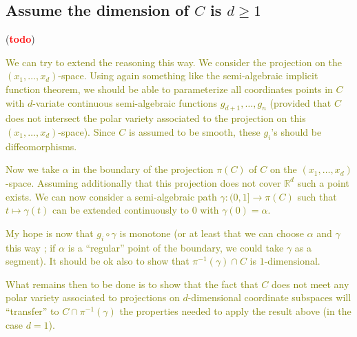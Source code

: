 \documentclass[11pt]{article}
\theoremstyle{definition}
\newcommand{\R}{\mathbb{R}}
\def\td{(\textcolor{red}{{\bf todo}})}
\def\td{(\textcolor{red}{{\bf todo}}) }
\def\ms#1{\textcolor{olive}{#1}}
\begin{document}
\subsection*{Assume the dimension of $C$ is $d\geq 1$}
\td 





\ms{We can try to extend the reasoning this way. We consider the projection on
  the $(x_1, \ldots, x_d)$-space. Using again something like the semi-algebraic
  implicit function theorem, we should be able to parameterize all coordinates
  points in $C$ with $d$-variate continuous semi-algebraic functions $g_{d+1},
  \ldots, g_n$ (provided that $C$ does not intersect the polar variety
  associated to the projection on this $(x_1, \ldots, x_d)$-space). Since $C$ is
  assumed to be smooth, these $g_i$'s should be diffeomorphisms.}

\ms{Now we take $\alpha$ in the boundary of the projection $\pi(C)$ of $C$ on
  the $(x_1, \ldots, x_d)$-space. Assuming additionally that this projection
  does not cover $\R^d$ such a point exists. We can now consider a
  semi-algebraic path $\gamma:(0, 1]\to \pi(C)$ such that $t\mapsto \gamma(t)$
  can be extended continuously to $0$ with $\gamma(0)=\alpha$. }

\ms{My hope is now that $g_i\circ \gamma$ is monotone (or at least that we can
  choose $\alpha$ and $\gamma$ this way ; if $\alpha$ is a ``regular'' point of
  the boundary, we could take $\gamma$ as a segment). It should be ok also to
  show that $\pi^{-1}(\gamma)\cap C$ is $1$-dimensional. }

\ms{What remains then to be done is to show that the fact that $C$ does not meet
any polar variety associated to projections on $d$-dimensional coordinate
subspaces will ``transfer'' to $C\cap \pi^{-1}(\gamma)$ the properties needed to
apply the result above (in the case $d = 1$).}
\end{document}
